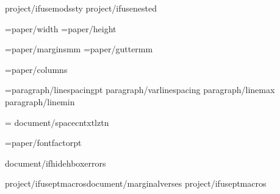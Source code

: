


{project/ifusemodssty} %
{project/ifusenested}    %

\PaperWidth={paper/width}
\PaperHeight={paper/height}

\MarginUnit={paper/margins}mm
\def\TopMarginFactor{{{paper/topmarginfactor}}}
\def\BottomMarginFactor{{{paper/bottommarginfactor}}}
\def\SideMarginFactor{{{paper/sidemarginfactor}}}
\BindingGutter={paper/gutter}mm

\BodyColumns={paper/columns}
\def\ColumnGutterFactor{{{document/colgutterfactor}}}

\def\LineSpacingFactor{{1.0}}
\def\VerticalSpaceFactor{{1.0}}
\baselineskip={paragraph/linespacing}pt {paragraph/varlinespacing} {paragraph/linemax} {paragraph/linemin}

\XeTeXinterwordspaceshaping = {document/spacecntxtlztn}

\FontSizeUnit={paper/fontfactor}pt

\def\regular{{"{fontregular/name}:{font/features}{document/script}{document/digitmapping}"}}
\def\bold{{"{fontbold/name}:{font/features}{document/script}{document/digitmapping}{fontbold/embolden}{fontbold/slant}"}}
\def\italic{{"{fontitalic/name}:{font/features}{document/script}{document/digitmapping}{fontitalic/embolden}{fontitalic/slant}"}}
\def\bolditalic{{"{fontbolditalic/name}:{font/features}{document/script}{document/digitmapping}{fontbolditalic/embolden}{fontbolditalic/slant}"}}

{document/ifhidehboxerrors}\overfullrule=0pt

{project/ifuseptmacros}{document/marginalverses}
{project/ifuseptmacros}

